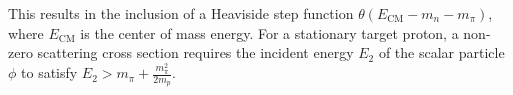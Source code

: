 \documentclass[11pt,english]{article}
\begin{document}
This results in the inclusion of a Heaviside step function $\theta(E_{\text{CM}}-m_n-m_{\pi})$, where $E_{\text{CM}}$ is the center of mass energy.  For a stationary target proton, a non-zero scattering cross section requires the incident energy $E_2$ of the scalar particle $\phi$ to satisfy $E_2 > m_{\pi}+\frac{m_{\pi}^2}{2m_{p}}$.













 
\end{document}
